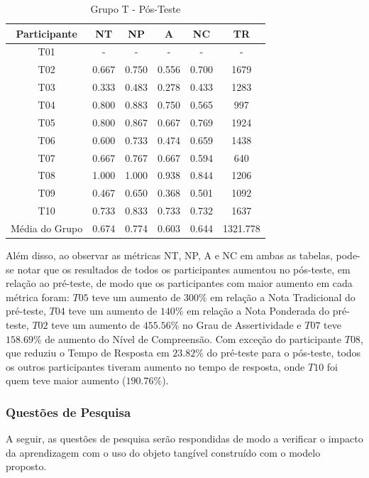 \begin{table}[htbp]
	\centering
	\caption{Grupo T - Pós-Teste}		
	\begin{tabular}{|c|c|c|c|c|c|}
		\hline
		\rowcolor[HTML]{C0C0C0} 
		\textbf{Participante} & \textbf{NT} & \textbf{NP} & \textbf{A} & \textbf{NC} & \textbf{TR} \\ \hline
		T01 & - & - & - & - & - \\ \hline
		\rowcolor[HTML]{EFEFEF} 
		T02 & 0.667 & 0.750 & 0.556 & 0.700 & 1679 \\ \hline
		T03 & 0.333 & 0.483 & 0.278 & 0.433 & 1283 \\ \hline
		\rowcolor[HTML]{EFEFEF} 
		T04 & 0.800 & 0.883 & 0.750 & 0.565 & 997 \\ \hline
		T05 & 0.800 & 0.867 & 0.667 & 0.769 & 1924 \\ \hline
		\rowcolor[HTML]{EFEFEF} 
		T06 & 0.600 & 0.733 & 0.474 & 0.659 & 1438 \\ \hline
		T07 & 0.667 & 0.767 & 0.667 & 0.594 & 640 \\ \hline
		\rowcolor[HTML]{EFEFEF} 
		T08 & 1.000 & 1.000 & 0.938 & 0.844 & 1206 \\ \hline
		T09 & 0.467 & 0.650 & 0.368 & 0.501 & 1092 \\ \hline
		\rowcolor[HTML]{EFEFEF} 
		T10 & 0.733 & 0.833 & 0.733 & 0.732 & 1637 \\ \hline
		Média do Grupo & 0.674 & 0.774 & 0.603 & 0.644 & 1321.778 \\ \hline
	\end{tabular}
	\label{tab:F1_A01-posteste}
\end{table}

Além disso, ao observar as métricas NT, NP, A e NC em ambas as tabelas, pode-se notar que os resultados de todos os participantes aumentou no pós-teste, em relação ao pré-teste, de modo que os participantes com maior aumento em cada métrica foram: $T05$ teve um aumento de $300\%$ em relação a Nota Tradicional do pré-teste, $T04$ teve um aumento de $140\%$ em relação a Nota Ponderada do pré-teste, $T02$ teve um aumento de $455.56\%$ no Grau de Assertividade e $T07$ teve $158.69\%$ de aumento do Nível de Compreensão. Com exceção do participante $T08$, que reduziu o Tempo de Resposta em $23.82\%$ do pré-teste para o pós-teste, todos os outros participantes tiveram aumento no tempo de resposta, onde $T10$ foi quem teve maior aumento ($190.76\%$).

\subsubsection{Questões de Pesquisa}\label{subsubsection:QP_F1H1}
A seguir, as questões de pesquisa serão respondidas de modo a verificar o impacto da aprendizagem com o uso do objeto tangível construído com o modelo proposto.


